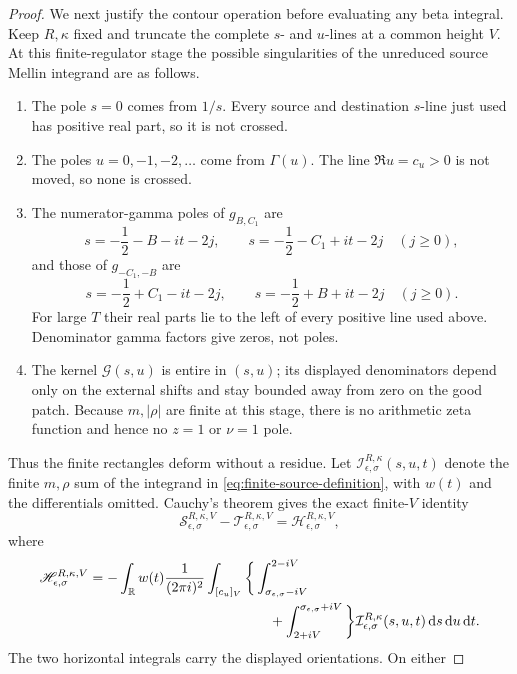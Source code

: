 \begin{proof}
We next justify the contour operation before evaluating any beta integral.
Keep $R,\kappa$ fixed and truncate the complete $s$- and $u$-lines at a
common height $V$.  At this finite-regulator stage the possible
singularities of the unreduced source Mellin integrand are as follows.
\begin{enumerate}[label=\textup{(\alph*)},leftmargin=8mm]
\item The pole $s=0$ comes from $1/s$.  Every source and destination
$s$-line just used has positive real part, so it is not crossed.
\item The poles $u=0,-1,-2,\ldots$ come from $\Gamma(u)$.  The line
$\Re u=c_u>0$ is not moved, so none is crossed.
\item The numerator-gamma poles of $g_{B,C_1}$ are
\[
 s=-\frac12-B-it-2j,\qquad s=-\frac12-C_1+it-2j
 \quad(j\geq0),
\]
and those of $g_{-C_1,-B}$ are
\[
 s=-\frac12+C_1-it-2j,\qquad s=-\frac12+B+it-2j
 \quad(j\geq0).
\]
For large $T$ their real parts lie to the left of every positive line used
above.  Denominator gamma factors give zeros, not poles.
\item The kernel $\mathcal G(s,u)$ is entire in $(s,u)$; its displayed
denominators depend only on the external shifts and stay bounded away from
zero on the good patch.  Because $m,|\rho|$ are finite at this stage, there
is no arithmetic zeta function and hence no $z=1$ or $\nu=1$ pole.
\end{enumerate}
Thus the finite rectangles deform without a residue.  Let
$\mathcal I_{\epsilon,\sigma}^{R,\kappa}(s,u,t)$ denote the finite
$m,\rho$ sum of the integrand in \eqref{eq:finite-source-definition}, with
$w(t)$ and the differentials omitted.  Cauchy's theorem gives the exact
finite-$V$ identity
\begin{equation}\label{eq:finite-rectangle-identity}
 \mathscr S_{\epsilon,\sigma}^{R,\kappa,V}
 -\mathscr T_{\epsilon,\sigma}^{R,\kappa,V}
 =\mathscr H_{\epsilon,\sigma}^{R,\kappa,V},
\end{equation}
where
\begin{align}
 \mathscr H_{\epsilon,\sigma}^{R,\kappa,V}
 =-\int_{\mathbb R}w(t)\frac1{(2\pi i)^2}\int_{[c_u]_V}
 \bigg\{&\int_{\sigma_{\epsilon,\sigma}-iV}^{2-iV}\notag\\
 &\quad+\int_{2+iV}^{\sigma_{\epsilon,\sigma}+iV}\bigg\}
 \mathcal I_{\epsilon,\sigma}^{R,\kappa}(s,u,t)
 \,\mathrm d s\,\mathrm d u\,\mathrm d t.
 \label{eq:finite-horizontal-remainder}
\end{align}
The two horizontal integrals carry the displayed orientations.  On either

\end{proof}
